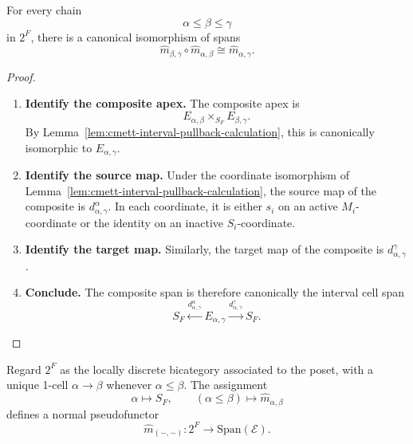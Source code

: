 \begin{theorem}
\label{thm:cmett-interval-span-composition}
    For every chain
    \[
        \alpha\leq\beta\leq\gamma
    \]
    in \(2^F\), there is a canonical isomorphism of spans
    \[
        \widehat m_{\beta,\gamma}\circ\widehat m_{\alpha,\beta}
        \cong
        \widehat m_{\alpha,\gamma}.
    \]
\end{theorem}

\begin{proof}
    \leavevmode
    \begin{enumerate}
        \item \textbf{Identify the composite apex.}
        The composite apex is
        \[
            E_{\alpha,\beta}\times_{S_F}E_{\beta,\gamma}.
        \]
        By Lemma~\ref{lem:cmett-interval-pullback-calculation}, this is
        canonically isomorphic to \(E_{\alpha,\gamma}\).

        \item \textbf{Identify the source map.}
        Under the coordinate isomorphism of
        Lemma~\ref{lem:cmett-interval-pullback-calculation}, the source map of
        the composite is \(d_{\alpha,\gamma}^{\alpha}\). In each coordinate,
        it is either \(s_i\) on an active \(M_i\)-coordinate or the identity
        on an inactive \(S_i\)-coordinate.

        \item \textbf{Identify the target map.}
        Similarly, the target map of the composite is
        \(d_{\alpha,\gamma}^{\gamma}\).

        \item \textbf{Conclude.}
        The composite span is therefore canonically the interval cell span
        \[
            S_F
            \xleftarrow{d_{\alpha,\gamma}^{\alpha}}
            E_{\alpha,\gamma}
            \xrightarrow{d_{\alpha,\gamma}^{\gamma}}
            S_F.
        \]
    \end{enumerate}
\end{proof}

\begin{theorem}
\label{thm:cmett-interval-execution-pseudofunctor}
    Regard \(2^F\) as the locally discrete bicategory associated to the
    poset, with a unique 1-cell \(\alpha\to\beta\) whenever
    \(\alpha\leq\beta\). The assignment
    \[
        \alpha\longmapsto S_F,
        \qquad
        (\alpha\leq\beta)\longmapsto \widehat m_{\alpha,\beta}
    \]
    defines a normal pseudofunctor
    \[
        \widehat m_{(-,-)}:2^F\to\mathrm{Span}(\mathcal E).
    \]
\end{theorem}


